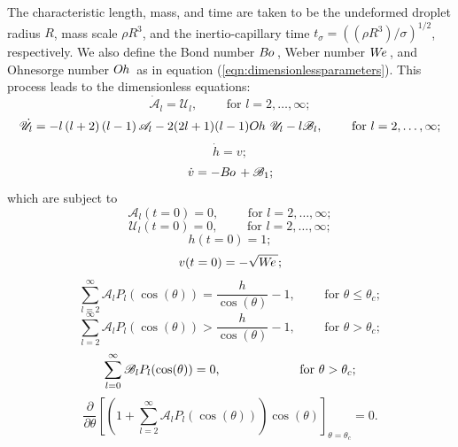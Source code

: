 \documentclass{jfm}
\newcommand{\We}{W\kern-0.15em e\,}
\newcommand{\Bo}{B\kern-0.05em o\,}
\newcommand{\Oh}{O\kern-0.05em h\,}
\begin{document}
The characteristic length, mass, and time are taken to be the undeformed droplet radius $R$, mass scale $\rho R^{3}$, and the inertio-capillary time $t_{\sigma}= \left(\left( \rho R^{3} \right) / \sigma \right)^{1/2}$, respectively. We also define the Bond number $\Bo$, Weber number $\We$, and Ohnesorge number $\Oh$ as in equation (\ref{eqn:dimensionlessparameters}). This process leads to the dimensionless equations:
\begin{equation}\label{eqn:nd_dot_A_l_v01}
    \dot{\mathscr{A}}_l = \mathscr{U}_l, \qquad \text{ for } l = 2,\ldots, \infty;
\end{equation}
\begin{equation}\label{eqn:nd_dot_U_l_v01}
    \dot{\mathscr{U}}_l 
    =
    -l \left(l+2\right)\left(l-1\right)\mathscr{A}_l
    -2(2l+1)(l-1) \Oh \, \mathscr{U}_l
    -l \mathscr{B}_l, \qquad \text{ for } l = 2,\ldots, \infty;
\end{equation}
\begin{equation}\label{eqn:nd_dot_h_v}
    \dot{h} = v;
\end{equation}
\begin{equation} \label{eqn:nd_dot_v}
    \dot{v} = - \Bo + \mathscr{B}_1;
\end{equation}
which are subject to 
\begin{equation}
    \mathscr{A}_l(t=0) = 0, \qquad \text{ for } l = 2,\ldots, \infty;
\end{equation}
\begin{equation}
    \mathscr{U}_l(t=0) = 0, \qquad \text{ for } l = 2,\ldots, \infty;
\end{equation}
\begin{equation}
    h(t=0) = 1;
\end{equation}
\begin{equation}
    v(t=0) =- \sqrt{\We};
\end{equation}
\begin{equation}\label{eqn:km_contact_amplitudes}
    \sum\limits_{l=2}^\infty {\mathscr{A}_lP_l(\cos(\theta))} = \frac{h}{\cos(\theta)}-1, \qquad \text{ for } \theta \leq \theta_c;
\end{equation}
\begin{equation}\label{eqn:km_non-contact_amplitudes}
    \sum\limits_{l=2}^\infty {\mathscr{A}_lP_l(\cos(\theta))} > \frac{h}{\cos(\theta)}-1, \qquad \text{ for } \theta > \theta_c;
\end{equation}
\begin{equation}\label{eqn:km_pressure_amplitudes}
    \sum\limits_{l=0}^\infty {\mathscr{B}_lP_l(\cos(\theta))} = 0, \qquad \hspace{14 mm} \text{ for } \theta > \theta_c;
\end{equation}
\begin{equation}\label{eqn:km_contact_derivative}
    \frac{\partial}{\partial \theta}\left[\left(1+\sum\limits_{l=2}^\infty {\mathscr{A}_lP_l(\cos(\theta))}\right)\cos(\theta)\right]_{\theta=\theta_c} = 0.
\end{equation}
\end{document}
